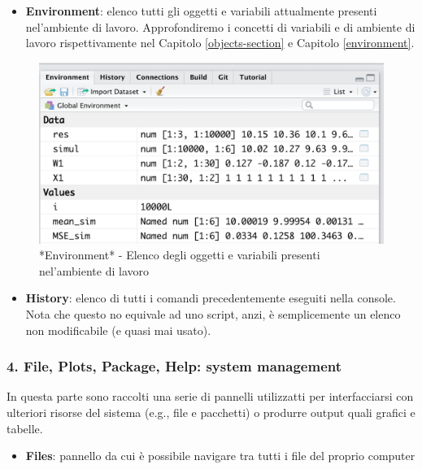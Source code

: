 \documentclass[
]{book}
\providecommand{\tightlist}{%
  \setlength{\itemsep}{0pt}\setlength{\parskip}{0pt}}
\begin{document}
\begin{itemize}
\tightlist
\item
  \textbf{Environment}: elenco tutti gli oggetti e variabili attualmente presenti nel'ambiente di lavoro. Approfondiremo i concetti di variabili e di ambiente di lavoro rispettivamente nel Capitolo \ref{objects-section} e Capitolo \ref{environment}.
\end{itemize}

\begin{figure}

{\centering \includegraphics[width=0.6\linewidth]{images/environment} 

}

\caption{*Environment* - Elenco degli oggetti e variabili presenti nel'ambiente di lavoro}\label{fig:environment}
\end{figure}

\begin{itemize}
\tightlist
\item
  \textbf{History}: elenco di tutti i comandi precedentemente eseguiti nella console. Nota che questo no equivale ad uno script, anzi, è semplicemente un elenco non modificabile (e quasi mai usato).
\end{itemize}

\hypertarget{file-plots-package-help-system-management}{%
\subsubsection*{4. File, Plots, Package, Help: system management}\label{file-plots-package-help-system-management}}

In questa parte sono raccolti una serie di pannelli utilizzatti per interfacciarsi con ulteriori risorse del sistema (e.g., file e pacchetti) o produrre output quali grafici e tabelle.

\begin{itemize}
\tightlist
\item
  \textbf{Files}: pannello da cui è possibile navigare tra tutti i file del proprio computer
\end{itemize}
\end{document}
